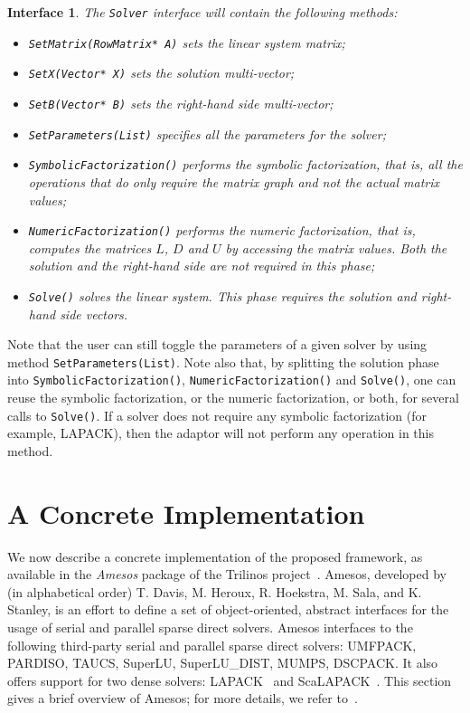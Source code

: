 \documentclass[acmtocl]{acmtrans2m}
\newtheorem{interface}{Interface}[section]
\begin{document}
\begin{interface}
\label{int:asi}
The {\tt Solver} interface
will contain the following methods:
\begin{itemize}
\item \verb!SetMatrix(RowMatrix* A)! sets the linear system matrix;
\item \verb!SetX(Vector* X)! sets the solution multi-vector;
\item \verb!SetB(Vector* B)! sets the right-hand side multi-vector;
\item \verb!SetParameters(List)! specifies all the parameters for the solver;
\item \verb!SymbolicFactorization()! performs the symbolic factorization, that
is, all the operations that do only require the matrix graph and not the
actual matrix values;
\item \verb!NumericFactorization()! performs the numeric factorization, that
is, computes the matrices $L$, $D$ and $U$ by accessing the matrix values.
Both the solution and the right-hand side are not required in this phase;
\item \verb!Solve()! solves the linear system. This phase requires the
solution and right-hand side vectors.
\end{itemize}
\end{interface}

Note that the user can still toggle the parameters of a given solver by using
method \verb!SetParameters(List)!. Note also that, by splitting the solution phase
into \verb!SymbolicFactorization()!, \verb!NumericFactorization()! and
\verb!Solve()!, one can reuse the symbolic factorization, or the numeric
factorization, or both, for several calls to \verb!Solve()!. If a solver does
not require any symbolic factorization (for example, LAPACK), then the adaptor
will not perform any operation in this method.

\section{A Concrete Implementation}
\label{sec:concrete}

We now describe a concrete implementation of the proposed framework, as
available in the {\sl Amesos} package of the Trilinos
project~\cite{heroux05trilinos,trilinos-home-page}.
Amesos, developed by (in alphabetical order) T. Davis,
M. Heroux, R. Hoekstra, M. Sala, and K. Stanley, is an effort to define a set
of object-oriented, abstract interfaces for the usage of serial and
parallel sparse direct solvers. 
Amesos interfaces to the following third-party serial and parallel sparse
direct solvers: UMFPACK, PARDISO, TAUCS, SuperLU, SuperLU\_DIST, MUMPS,
DSCPACK. It also offers support for two dense solvers:
LAPACK~\cite{lapack-guide} and
ScaLAPACK~\cite{scalapack-guide}.
This section gives a brief overview of Amesos; for more details, we
refer to~\cite{Amesos-Reference-Guide}.
\end{document}
